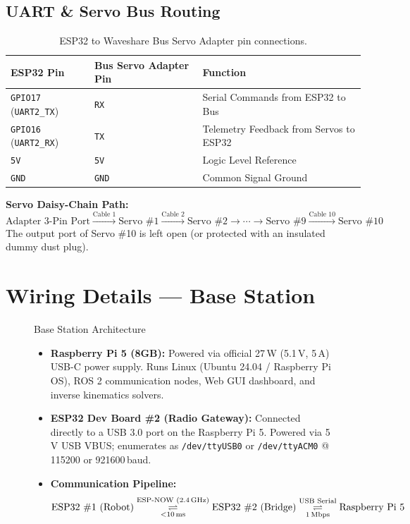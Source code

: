 \documentclass[11pt,a4paper]{article}
\begin{document}
\subsection{UART \& Servo Bus Routing}
\begin{table}[h!]
\centering
\small
\renewcommand{\arraystretch}{1.2}
\begin{tabular}{lll}
\toprule
\textbf{ESP32 Pin} & \textbf{Bus Servo Adapter Pin} & \textbf{Function} \\
\midrule
\texttt{GPIO17} (\texttt{UART2\_TX}) & \texttt{RX} & Serial Commands from ESP32 to Bus \\
\texttt{GPIO16} (\texttt{UART2\_RX}) & \texttt{TX} & Telemetry Feedback from Servos to ESP32 \\
\texttt{5V} & \texttt{5V} & Logic Level Reference \\
\texttt{GND} & \texttt{GND} & Common Signal Ground \\
\bottomrule
\end{tabular}
\caption{ESP32 to Waveshare Bus Servo Adapter pin connections.}
\end{table}

\noindent \textbf{Servo Daisy-Chain Path:}
$$\text{Adapter 3-Pin Port} \xrightarrow{\text{Cable 1}} \text{Servo \#1} \xrightarrow{\text{Cable 2}} \text{Servo \#2} \longrightarrow \cdots \longrightarrow \text{Servo \#9} \xrightarrow{\text{Cable 10}} \text{Servo \#10}$$
The output port of Servo \#10 is left open (or protected with an insulated dummy dust plug).

\section{Wiring Details --- Base Station}

\begin{figure}[h!]
\centering
\begin{specbox}{Base Station Architecture}
\begin{itemize}[leftmargin=1.2em, itemsep=0.25em]
    \item \textbf{Raspberry Pi 5 (8GB):} Powered via official 27\,W (5.1\,V, 5\,A) USB-C power supply. Runs Linux (Ubuntu 24.04 / Raspberry Pi OS), ROS 2 communication nodes, Web GUI dashboard, and inverse kinematics solvers.
    \item \textbf{ESP32 Dev Board \#2 (Radio Gateway):} Connected directly to a USB 3.0 port on the Raspberry Pi 5. Powered via 5\,V USB VBUS; enumerates as \texttt{/dev/ttyUSB0} or \texttt{/dev/ttyACM0} @ 115200 or 921600\,baud.
    \item \textbf{Communication Pipeline:}
    $$\text{ESP32 \#1 (Robot)} \underset{<10\,\text{ms}}{\overset{\text{ESP-NOW (2.4\,GHz)}}{\rightleftharpoons}} \text{ESP32 \#2 (Bridge)} \underset{1\,\text{Mbps}}{\overset{\text{USB Serial}}{\rightleftharpoons}} \text{Raspberry Pi 5}$$
\end{itemize}
\end{specbox}
\end{figure}
\end{document}
